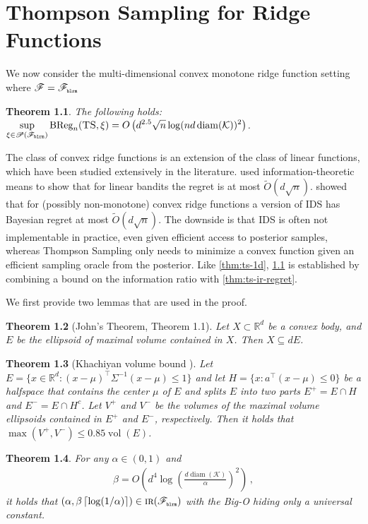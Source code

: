 \documentclass[letter, 12pt]{report}
\newcommand{\pr}{\text{\tiny\texttt{r}}}
\newcommand{\pb}{\text{\tiny\texttt{b}}}
\newcommand{\pl}{\text{\tiny\texttt{l}}}
\renewcommand{\pm}{\text{\tiny\texttt{m}}}
\newcommand{\ceil}[1]{\left\lceil #1 \right\rceil}
\newcommand{\R}{\mathbb R}
\newcommand{\BReg}{\textrm{BReg}}
\newcommand{\cK}{\mathcal K}
\newcommand{\sF}{\mathscr F}
\newcommand{\sP}{\mathscr P}
\newcommand{\vol}{\operatorname{vol}}
\newcommand{\diam}{\operatorname{diam}}
\newcommand{\1}{\mathbf{1}}
\newcommand{\IR}{\operatorname{\textsc{ir}}}
\newcommand{\ts}{\textsc{TS}\xspace}
\newcommand{\IDS}{\textsc{IDS}}
\theoremstyle{plain}
\newtheorem{theorem}{Theorem}
\theoremstyle{definition}
\theoremstyle{remark}
\begin{document}
\chapter{Thompson Sampling for Ridge Functions}

We now consider the multi-dimensional convex monotone ridge function setting where $\sF = \sF_{\pb\pl\pr\pm}$

\begin{theorem}\label{thm:ts-ridge}
    The following holds:
    $\displaystyle \sup_{\xi \in \sP(\sF_{\pb\pl\pr\pm})} \BReg_n(\ts, \xi) = O\left(d^{2.5} \sqrt{n} \log(n d \diam(\cK))^2\right)$.
\end{theorem}

The class of convex ridge functions is an extension of the class of linear functions, which have been studied extensively in the literature.
\cite{RV16} used information-theoretic means to show that for linear bandits the regret is at most $\tilde O(d \sqrt{n})$.
\cite{lattimore2021minimax} showed that for (possibly non-monotone) convex ridge functions a version of \IDS{} has Bayesian regret at most $\tilde O(d \sqrt{n})$.
The downside is that \IDS{} is often not implementable in practice, even given efficient access to posterior samples, whereas Thompson Sampling only needs to minimize a convex function given an efficient sampling oracle from the posterior.
Like \cref{thm:ts-1d}, \cref{thm:ts-ridge} is established by combining a bound on the information ratio with \cref{thm:ts-ir-regret}.

We first provide two lemmas that are used in the proof.
\begin{theorem}[John's Theorem, \cite{todd2016minimum} Theorem 1.1]
    \label{thm:john}
    Let $X \subset \R^d$ be a convex body, and $E$ be the ellipsoid of maximal volume contained in $X$. Then $X \subseteq d E$.
\end{theorem}
\begin{theorem}[Khachiyan volume bound \cite{khachiyan1990inequality}]\label{thm:khachiyan}
    Let $E=\{x\in\mathbb{R}^d:(x-\mu)^\top\Sigma^{-1}(x-\mu)\le1\}$ and let
    $H=\{x:a^\top(x-\mu)\le0\}$ be a halfspace
    that contains the center $\mu$ of $E$ and splits $E$ into two parts
    $E^+ = E \cap H$ and $E^- = E \cap H^c$.
    Let $V^+$ and $V^-$ be the volumes of the maximal volume ellipsoids contained in $E^+$ and $E^-$, respectively.
    Then it holds that $\max(V^+, V^-) \leq 0.85 \vol(E)$.
\end{theorem}


\begin{theorem}\label{thm:ridge-ir}
    For any $\alpha \in (0,1)$ and
    \begin{align*}
        \beta = O\left(d^4 \log\left(\frac{d \diam(\cK)}{\alpha}\right)^2\right) \,,
    \end{align*}
    it holds that $(\alpha, \beta \ceil{\log(1/\alpha)}) \in \IR(\sF_{\pb\pl\pr\pm})$ with the Big-O hiding only a universal constant.
\end{theorem}
\end{document}
